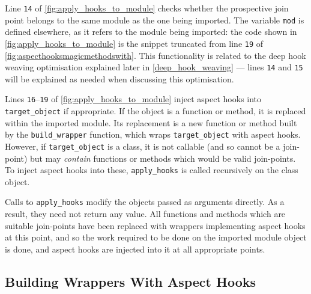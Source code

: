 Line \texttt{14} of \cref{fig:apply_hooks_to_module} checks whether the
prospective join point belongs to the same module as the one being imported. The
variable \lstinline{mod} is defined elsewhere, as it refers to the module being
imported: the code shown in \cref{fig:apply_hooks_to_module} is the snippet
truncated from line \texttt{19} of \cref{fig:aspecthooksmagicmethodswith}. This
functionality is related to the deep hook weaving optimisation explained later
in \cref{deep_hook_weaving} --- lines \texttt{14} and \texttt{15} will be
explained as needed when discussing this optimisation.

Lines \texttt{16}--\texttt{19} of \cref{fig:apply_hooks_to_module} inject aspect
hooks into \lstinline{target_object} if appropriate. If the object is a function
or method, it is replaced within the imported module. Its replacement is a
new function or method built by the \lstinline{build_wrapper} function, which wraps
\lstinline{target_object} with aspect hooks. However, if
\lstinline{target_object} is a class, it is not callable (and so cannot be a
join-point) but may \emph{contain} functions or methods which would be valid
join-points. To inject aspect hooks into these, \lstinline{apply_hooks} is
called recursively on the class object.

Calls to \lstinline{apply_hooks} modify the objects passed as arguments
directly. As a result, they need not return any value. All functions
and methods which are suitable join-points have been replaced with wrappers
implementing aspect hooks at this point, and so the work required to be done on
the imported module object is done, and aspect hooks are injected into it at all
appropriate points.


\subsection{Building Wrappers With Aspect Hooks}
\label{building_aspect_Hook_wrappers}

